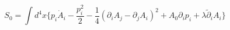 \begin{equation} 
S_0= \int d^4x \{p_i \dot A_i- \frac{p_i^2}{2}- 
\frac{1}{4}(\partial_iA_j-\partial_jA_i)^2+A_0 \partial_ip_i+ \lambda 
\tilde{\partial}_iA_i \}
\label{11} 
 \end{equation} 
